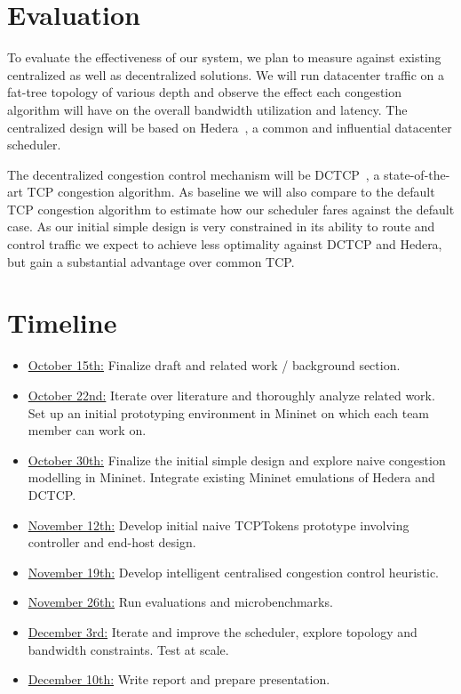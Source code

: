 \documentclass[sigconf]{acmart}
\begin{document}
\section{Evaluation}
\label{sec:evaluation}
To evaluate the effectiveness of our system, we plan to measure against existing centralized as well as decentralized solutions. We will run datacenter traffic on a fat-tree topology of various depth and observe the effect each congestion algorithm will have on the overall bandwidth utilization and latency.
The centralized design will be based on Hedera~\cite{hedera}, a common and influential datacenter scheduler.

The decentralized congestion control mechanism will be DCTCP~\cite{dctcp}, a state-of-the-art TCP congestion algorithm. As baseline we will also compare to the default TCP congestion algorithm to estimate how our scheduler fares against the default case. As our initial simple design is very constrained in its ability to route and control traffic we expect to achieve less optimality against DCTCP and Hedera, but gain a substantial advantage over common TCP.

\section{Timeline}
\label{sec:timeline}
\begin{itemize}
	\item \underline{October 15th:} Finalize draft and related work / background section.
	\item \underline{ October 22nd:} Iterate over literature and thoroughly analyze related work. Set up an initial prototyping environment in Mininet on which each team member can work on.
	\item \underline{October 30th:} Finalize the initial simple design and explore naive congestion modelling in Mininet. Integrate existing Mininet emulations of Hedera and DCTCP.
	\item \underline{November 12th:} Develop initial naive TCPTokens prototype involving controller and end-host design.
	\item \underline{November 19th:} Develop intelligent centralised congestion control heuristic.
	\item \underline{November 26th:} Run evaluations and microbenchmarks.
	\item \underline{December 3rd:} Iterate and improve the scheduler, explore topology and bandwidth constraints. Test at scale.
	\item \underline{December 10th:} Write report and prepare presentation.
\end{itemize}




 
\end{document}
